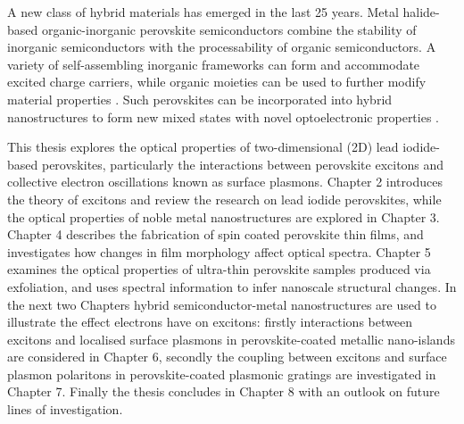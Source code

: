 A new class of hybrid materials has emerged in the last 25 years. Metal halide-based organic-inorganic perovskite semiconductors combine the stability of inorganic semiconductors with the processability of organic semiconductors. A variety of self-assembling inorganic frameworks can form and accommodate excited charge carriers, while organic moieties can be used to further modify material properties \cite{Cheng2010, Ishihara1990, Mitzi2001, Mitzi2001c, Nagami1996, Pradeesh2010, Pradeesh2009a, Lee2012, Heo2013, Liu2013, Hao2014}. Such perovskites can be incorporated into hybrid nanostructures to form new mixed states with novel optoelectronic properties \cite{Fujita1998, Fujita1999, Fujita2000, Ishi-Hayase2003, Brehier2006, Lanty2008, Pradeesh2009b, Sumioka2001}.

This thesis explores the optical properties of two-dimensional (2D) lead iodide-based perovskites, particularly the interactions between perovskite excitons and collective electron oscillations known as surface plasmons. Chapter 2 introduces the theory of excitons and review the research on lead iodide perovskites, while the optical properties of noble metal nanostructures are explored in Chapter 3. Chapter 4 describes the fabrication of spin coated perovskite thin films, and investigates how changes in film morphology affect optical spectra. Chapter 5 examines the optical properties of ultra-thin perovskite samples produced via exfoliation, and uses spectral information to infer nanoscale structural changes. In the next two Chapters hybrid semiconductor-metal nanostructures are used to illustrate the effect electrons have on excitons: firstly interactions between excitons and localised surface plasmons in perovskite-coated metallic nano-islands are considered in Chapter 6, secondly the coupling between excitons and surface plasmon polaritons in perovskite-coated plasmonic gratings are investigated in Chapter 7. Finally the thesis concludes in Chapter 8 with an outlook on future lines of investigation.